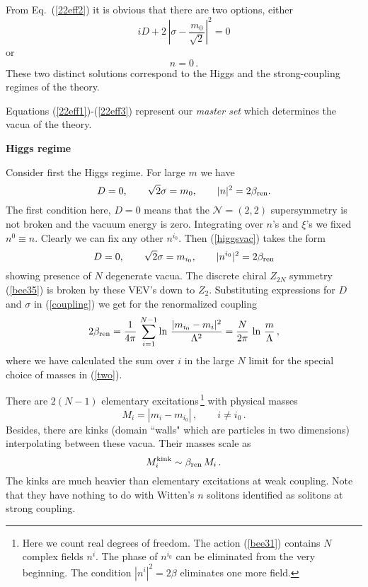 \documentclass[epsfig,12pt]{article}
\def\beq{\begin{equation}}
\def\eeq{\end{equation}}
\def\beq{\begin{equation}}
\def\eeq{\end{equation}}
\newcommand{\ntwot}{${\mathcal N}= \left(2,2\right) $ }
\begin{document}
From Eq.~(\ref{22eff2}) it is obvious that there are two options, either
\beq
\label{higgsph22}
	 iD + 2\,\left| \sigma - \frac{ m_0}{\sqrt{2}}\right|^2 = 0  
\eeq
or
\beq
\label{strongph22}
	 n = 0 \,. 
\eeq
	These two distinct solutions correspond to the Higgs and the strong-coupling regimes of the theory. 
	


Equations (\ref{22eff1})-(\ref{22eff3}) represent our {\em master set} which
determines the vacua of the theory. 

\begin{center}
{\bf Higgs regime}
\end{center}



Consider first the Higgs regime.
For large $m$ we have
\beq
D=0,\qquad \sqrt{2}\sigma=m_0,\qquad |n|^2=2\beta_{\rm ren}.
\label{higgsvac}
\eeq
The first condition here, $D=0$ means that the \ntwot supersymmetry is not broken and the vacuum
energy is zero. Integrating over $n$'s and $\xi$'s we fixed $n^{0}\equiv n$. Clearly we can fix
any other $n^{i_0}$. Then (\ref{higgsvac}) takes the form 
\beq
D=0,\qquad \sqrt{2}\sigma=m_{i_0},\qquad |n^{i_0}|^2=2\beta_{\rm ren}
\label{higgsvacN}
\eeq
showing presence of $N$ degenerate vacua. The discrete chiral $Z_{2N}$ symmetry (\ref{bee35})
is broken by these VEV's down to $Z_2$. Substituting expressions for $D$ and $\sigma$ in (\ref{coupling})
we get for the renormalized coupling 
\beq
2\beta_{\rm ren}=\frac{1}{4\pi}\, 
\sum_{i=1}^{N-1}\ln\, {\frac{|m_{i_0}-m_i|^2}{\Lambda^2}}=\frac{N}{2\pi}\,\ln\,{\frac{m}{\Lambda}}\, ,
\label{22higgscoupling}
\eeq
where we have calculated the sum over $i$ in the large $N$ limit for the special choice of masses
 in (\ref{two}).

There are $2(N-1)$ elementary excitations\,\footnote{Here we count
real degrees of
freedom. The action (\ref{bee31}) contains $N$ complex fields
$n^i$.
The phase of $n^{i_0}$ can be eliminated from the very beginning.
The condition $|n^i|^2 = 2\beta$ eliminates one more field.
} with physical masses
\beq
M_i = |m_i-m_{i_0}|\,,\qquad i\neq i_0\,.
\label{elmass}
\eeq
Besides, there are kinks (domain ``walls" which are particles in two
dimensions) interpolating between these vacua. Their masses scale as
\beq
M^{\rm kink}_{i} \sim \beta_{\rm ren}\,M_i \,.
\label{kinkmass}
\eeq
The kinks  are much  heavier than elementary
excitations at weak coupling. Note that they have nothing to do
with Witten's $n$ solitons \cite{W79} identified as solitons at
strong coupling.
\end{document}
